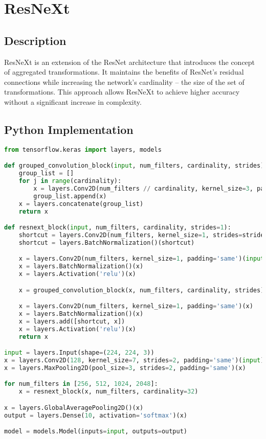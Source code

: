 \chapter{ResNeXt}

\section{Description}
ResNeXt is an extension of the ResNet architecture that introduces the concept of aggregated transformations. It maintains the benefits of ResNet's residual connections while increasing the network's cardinality – the size of the set of transformations. This approach allows ResNeXt to achieve higher accuracy without a significant increase in complexity.

\section{Python Implementation}
\begin{lstlisting}[language=Python]
from tensorflow.keras import layers, models

def grouped_convolution_block(input, num_filters, cardinality, strides):
    group_list = []
    for j in range(cardinality):
        x = layers.Conv2D(num_filters // cardinality, kernel_size=3, padding='same', strides=strides, groups=cardinality)(input)
        group_list.append(x)
    x = layers.concatenate(group_list)
    return x

def resnext_block(input, num_filters, cardinality, strides=1):
    shortcut = layers.Conv2D(num_filters, kernel_size=1, strides=strides)(input)
    shortcut = layers.BatchNormalization()(shortcut)

    x = layers.Conv2D(num_filters, kernel_size=1, padding='same')(input)
    x = layers.BatchNormalization()(x)
    x = layers.Activation('relu')(x)

    x = grouped_convolution_block(x, num_filters, cardinality, strides)

    x = layers.Conv2D(num_filters, kernel_size=1, padding='same')(x)
    x = layers.BatchNormalization()(x)
    x = layers.add([shortcut, x])
    x = layers.Activation('relu')(x)
    return x

input = layers.Input(shape=(224, 224, 3))
x = layers.Conv2D(128, kernel_size=7, strides=2, padding='same')(input)
x = layers.MaxPooling2D(pool_size=3, strides=2, padding='same')(x)

for num_filters in [256, 512, 1024, 2048]:
    x = resnext_block(x, num_filters, cardinality=32)

x = layers.GlobalAveragePooling2D()(x)
output = layers.Dense(10, activation='softmax')(x)

model = models.Model(inputs=input, outputs=output)
\end{lstlisting}

